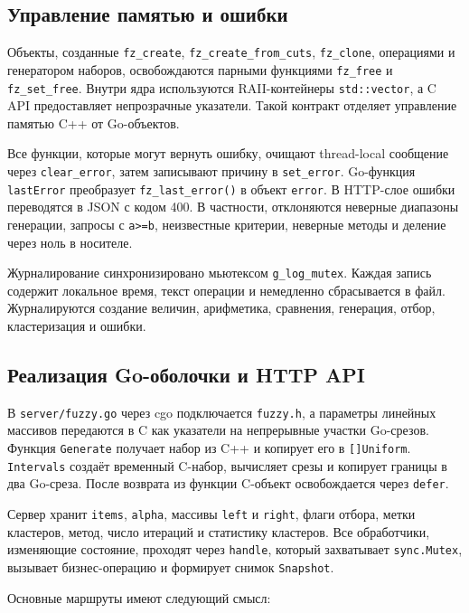 \subsection{Управление памятью и ошибки}

Объекты, созданные \texttt{fz\_create}, \texttt{fz\_create\_from\_cuts}, \texttt{fz\_clone}, операциями и генератором наборов, освобождаются парными функциями \texttt{fz\_free} и \texttt{fz\_set\_free}. Внутри ядра используются RAII-контейнеры \texttt{std::vector}, а C API предоставляет непрозрачные указатели. Такой контракт отделяет управление памятью C++ от Go-объектов.

Все функции, которые могут вернуть ошибку, очищают thread-local сообщение через \texttt{clear\_error}, затем записывают причину в \texttt{set\_error}. Go-функция \texttt{lastError} преобразует \texttt{fz\_last\_error()} в объект \texttt{error}. В HTTP-слое ошибки переводятся в JSON с кодом 400. В частности, отклоняются неверные диапазоны генерации, запросы с \texttt{a>=b}, неизвестные критерии, неверные методы и деление через ноль в носителе.

Журналирование синхронизировано мьютексом \texttt{g\_log\_mutex}. Каждая запись содержит локальное время, текст операции и немедленно сбрасывается в файл. Журналируются создание величин, арифметика, сравнения, генерация, отбор, кластеризация и ошибки.

\subsection{Реализация Go-оболочки и HTTP API}

В \texttt{server/fuzzy.go} через cgo подключается \texttt{fuzzy.h}, а параметры линейных массивов передаются в C как указатели на непрерывные участки Go-срезов. Функция \texttt{Generate} получает набор из C++ и копирует его в \texttt{[]Uniform}. \texttt{Intervals} создаёт временный C-набор, вычисляет срезы и копирует границы в два Go-среза. После возврата из функции C-объект освобождается через \texttt{defer}.

Сервер хранит \texttt{items}, \texttt{alpha}, массивы \texttt{left} и \texttt{right}, флаги отбора, метки кластеров, метод, число итераций и статистику кластеров. Все обработчики, изменяющие состояние, проходят через \texttt{handle}, который захватывает \texttt{sync.Mutex}, вызывает бизнес-операцию и формирует снимок \texttt{Snapshot}.

Основные маршруты имеют следующий смысл:

